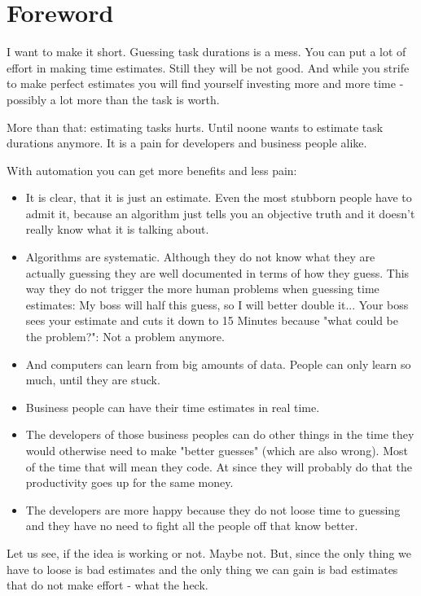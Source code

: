 \hypertarget{foreword}{%
\section{Foreword}\label{foreword}}

I want to make it short. Guessing task durations is a mess. You can put
a lot of effort in making time estimates. Still they will be not good.
And while you strife to make perfect estimates you will find yourself
investing more and more time - possibly a lot more than the task is
worth.

More than that: estimating tasks hurts. Until noone wants to estimate
task durations anymore. It is a pain for developers and business people 
alike.

With automation you can get more benefits and less pain:

\begin{itemize}
\tightlist
\item
  It is clear, that it is just an estimate. Even the most stubborn people have to admit it, because an algorithm just tells you an objective truth and it doesn't really know what it is talking about.
\item
  Algorithms are systematic. Although they do not know what they are actually guessing they are well documented in terms of how they guess. This way they do not trigger the more human problems when guessing time estimates: My boss will half this guess, so I will better double it... Your boss sees your estimate and cuts it down to 15 Minutes because "what could be the problem?": Not a problem anymore.
\item
    And computers can learn from big amounts of data. People can only learn so much, until they are stuck.
\item
  Business people can have their time estimates in real time.
\item
  The developers of those business peoples can do other things in the time they would otherwise need to make "better guesses" (which are also wrong). Most of the time that will mean they code. At since they will probably do that the productivity goes up for the same money.
\item
  The developers are more happy because they do not loose time to guessing and they have no need to fight all the people off that know better.
\end{itemize}

Let us see, if the idea is working or not. Maybe not. But, since the
only thing we have to loose is bad estimates and the only thing we can
gain is bad estimates that do not make effort - what the heck.
